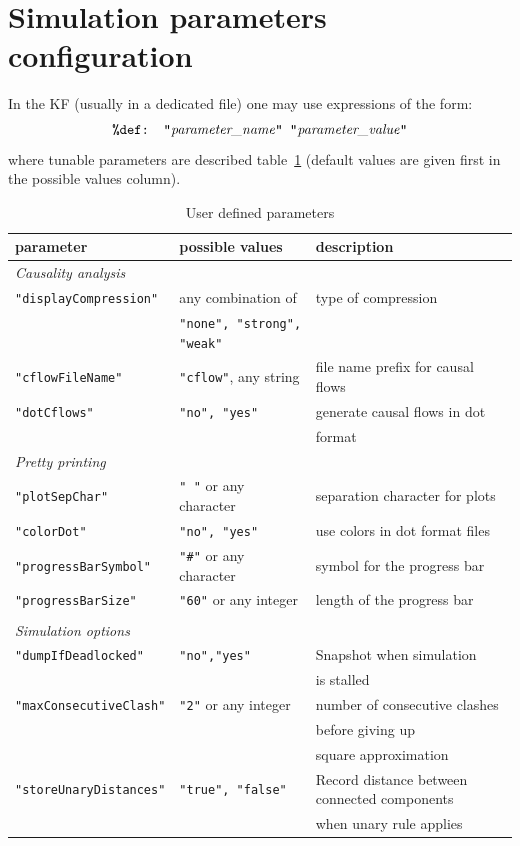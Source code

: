 \documentclass[11pt]{book}
\def\ttt#1{\texttt{#1}}
\begin{document}
\section{Simulation parameters configuration}\label{sec:param}

In the KF (usually in a dedicated file) one may use expressions of the form:
\[
\hbox{\ttt{\%def: "}\textit{parameter\_name}\ttt{" "}\textit{parameter\_value}\ttt{"}}
\]
where tunable parameters are described table~\ref{tab:parameters} (default values are given first in the possible values column).
\begin{table}[ht]
\caption{User defined parameters}
\begin{tabular}{l|l|l}
parameter & possible values & description \\
\hline
\textit{Causality analysis}& &\\
\ttt{"displayCompression"} & any combination of & \small type of compression \\
&  \ttt{"none", "strong", "weak"} & \\
\ttt{"cflowFileName"} & \ttt{"cflow"}, any string & \small file name prefix for causal flows\\
\ttt{"dotCflows"} & \ttt{"no", "yes"} & \small generate causal flows in dot \\
& & format\\
\textit{Pretty printing}& &\\
\ttt{"plotSepChar"} & \ttt{" "} or any character & \small separation character for plots\\
\ttt{"colorDot"} &  \ttt{"no", "yes"} & \small use colors in dot format files\\
\ttt{"progressBarSymbol"} & \ttt{"\#"} or any character & \small symbol for the progress bar\\
\ttt{"progressBarSize"} & \ttt{"60"} or any integer & \small length of the progress bar\\ &&\\
\textit{Simulation options} & &\\
\ttt{"dumpIfDeadlocked"} & \ttt{"no","yes"} & \small Snapshot when simulation \\&&\small is stalled\\
\ttt{"maxConsecutiveClash"} & \ttt{"2"} or any integer & \small number of consecutive clashes \\
&& \small before giving up \\
&& \small square approximation\\
\ttt{"storeUnaryDistances"} & \ttt{"true", "false"} & \small Record distance between connected components\\ 
&& \small when unary rule applies\\  
\end{tabular}
\label{tab:parameters}
\end{table}
\end{document}
